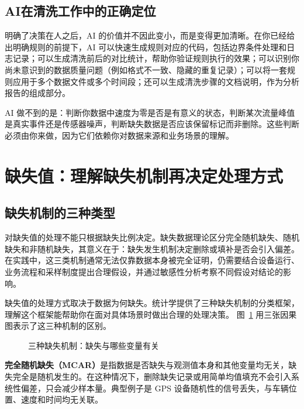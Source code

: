 \subsection{AI在清洗工作中的正确定位}

明确了决策在人之后，AI 的价值并不因此变小，而是变得更加清晰。在你已经给出明确规则的前提下，AI 可以快速生成规则对应的代码，包括边界条件处理和日志记录；可以生成清洗前后的对比统计，帮助你验证规则执行的效果；可以识别你尚未意识到的数据质量问题（例如格式不一致、隐藏的重复记录）；可以将一套规则应用于多个数据文件或多个时间段；还可以生成清洗步骤的文档说明，作为分析报告的组成部分。

AI 做不到的是：判断你数据中速度为零是否是有意义的状态，判断某次流量峰值是真实事件还是传感器噪声，判断缺失数据是否应该保留标记而非删除。这些判断必须由你来做，因为它们依赖你对数据来源和业务场景的理解。

\section{缺失值：理解缺失机制再决定处理方式}

\subsection{缺失机制的三种类型}

对缺失值的处理不能只根据缺失比例决定。缺失数据理论区分完全随机缺失、随机缺失和非随机缺失，其意义在于：缺失发生机制决定删除或填补是否会引入偏差\cite{little2019statistical}。在实践中，这三类机制通常无法仅靠数据本身被完全证明，仍需要结合设备运行、业务流程和采样制度提出合理假设，并通过敏感性分析考察不同假设对结论的影响。

缺失值的处理方式取决于数据为何缺失。统计学提供了三种缺失机制的分类框架，理解这个框架能帮助你在面对具体场景时做出合理的处理决策。
图~\ref{fig:ch05_mech} 用三张因果图表示了这三种机制的区别。

\begin{figure}[H]
  \centering
  \caption{三种缺失机制：缺失与哪些变量有关}
  \label{fig:ch05_mech}
\end{figure}

\textbf{完全随机缺失（MCAR）}是指数据是否缺失与观测值本身和其他变量均无关，缺失完全是随机发生的。在这种情况下，删除缺失记录或用简单均值填充不会引入系统性偏差，只会减少样本量。典型例子是 GPS 设备随机性的信号丢失，与车辆位置、速度和时间均无关联。

